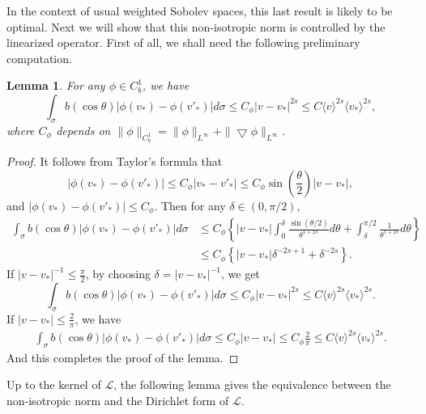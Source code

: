 \documentclass{amsart}[12pt, article]
\newtheorem{lemm}[theo]{Lemma}
\begin{document}
In the context of usual weighted Sobolev spaces, this last result is likely to be optimal.
 Next we will show that this non-isotropic norm is controlled by the linearized operator.  First of all, we shall need the
 following preliminary computation.

\begin{lemm}\label{lemm2.2.2}
For any $\phi\in C^1_b$, we have
\begin{equation*}\label{2.2.6}
\int_\sigma b(\cos\theta) | \phi(v_\ast) - \phi(v'_\ast) |d\sigma
\leq C_\phi | v-v_\ast|^{2s}\leq C \langle v\rangle^{2s} \langle
v_*\rangle^{2s},
\end{equation*}
where $C_\phi$ depends on
$\|\phi\|_{C^1_b}=\|\phi\|_{L^\infty}+\|\bigtriangledown
\phi\|_{L^\infty}$.
\end{lemm}
\begin{proof}  It follows {}from Taylor's formula that
\begin{equation*}\label{2.2.2+0}
|\phi(v_\ast) - \phi (v'_\ast) | \leq C_\phi | v_\ast-v'_\ast | \leq
C_\phi \sin \left(\frac{\theta}{2}\right) | v-v_\ast |,
\end{equation*}
and $| \phi(v_\ast) -\phi (v'_\ast) | \leq C_\phi$. Then for any
$\delta \in (0, \pi /2)$,
\begin{align*}
\int_\sigma b(\cos\theta) | \phi(v_\ast) - \phi (v'_\ast) |
d\sigma&\leq C_\phi \left\{ | v-v_\ast| \int^\delta_0
\frac{\sin(\theta/2)}{\theta^{1+2s}} d\theta + \int^{\pi /2}_\delta
\frac{1}{\theta^{1+2s}} d\theta\right\}\\
& \leq C_\phi \left\{ | v-v_\ast| \delta^{-2s +1} +
\delta^{-2s}\right\}.
\end{align*}
If $| v-v_\ast|^{-1} \leq \frac\pi 2$, by choosing $\delta = |
v-v_\ast|^{-1}$, we get
$$
\int_\sigma b(\cos\theta) | \phi(v_\ast) - \phi (v'_\ast) |
d\sigma\leq C_\phi | v-v_\ast|^{2s}\leq C \langle v\rangle^{2s}
\langle v_*\rangle^{2s}.
$$
If $| v-v_\ast | \leq \frac{2}{\pi}$, we have
\begin{align*}
\int_\sigma b(\cos\theta) | \phi(v_\ast) - \phi (v'_\ast) |
d\sigma\leq C_\phi | v-v_\ast | \leq C_\phi\frac{2}{\pi} \leq C
\langle v\rangle^{2s} \langle v_*\rangle^{2s}.
\end{align*}
And this completes the proof of the lemma.
\end{proof}

 Up to the kernel of ${{\mathcal L}}$, the following lemma
 gives the equivalence between the non-isotropic norm
 and the Dirichlet form of ${{\mathcal L}}$.
\end{document}
